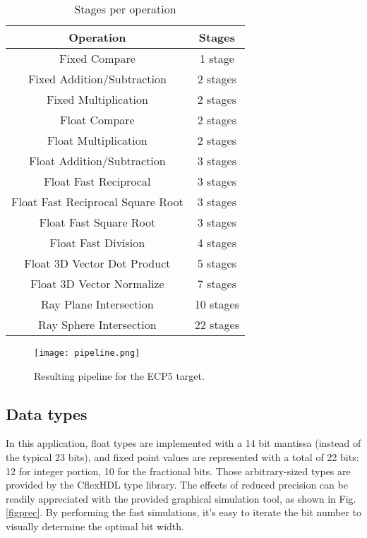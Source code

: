 \documentclass[conference]{IEEEtran}
\begin{document}
\begin{table}
\caption{Stages per operation}
\begin{center}
\begin{tabular}{|c|c|}
\hline \textbf{Operation}&  \textbf{Stages} \\
\hline Fixed Compare & 1 stage \\
\hline Fixed Addition/Subtraction & 2 stages \\
\hline Fixed Multiplication & 2 stages \\
\hline Float Compare & 2 stages \\
\hline Float Multiplication & 2 stages \\
\hline Float Addition/Subtraction & 3 stages \\
\hline Float Fast Reciprocal & 3 stages \\
\hline Float Fast Reciprocal Square Root & 3 stages \\
\hline Float Fast Square Root & 3 stages \\
\hline Float Fast Division & 4 stages \\
\hline Float 3D Vector Dot Product & 5 stages \\
\hline Float 3D Vector Normalize & 7 stages \\
\hline Ray Plane Intersection & 10 stages \\
\hline Ray Sphere Intersection & 22 stages \\
\hline
\end{tabular}
\label{tabopstages}
\end{center}
\end{table}


\begin{figure*}
\texttt{[image: pipeline.png]}
\caption{Resulting pipeline for the ECP5 target.}
\label{figstages}
\end{figure*}


\subsection{Data types}
In this application, float types are implemented with a 14 bit mantissa (instead of the typical 23 bits), and fixed point values are represented with a total of 22 bits: 12 for integer portion, 10 for the fractional bits. Those arbitrary-sized types are provided by the CflexHDL type library. The effects of reduced precision can be readily appreciated with the provided graphical simulation tool, as shown in Fig. \ref{figprec}.
By performing the fast simulations, it's easy to iterate the bit number to visually determine the optimal bit width.
\end{document}
